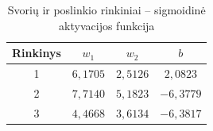 \begin{table}[H]
    \centering
    \caption{Svorių ir poslinkio rinkiniai – sigmoidinė aktyvacijos funkcija}
    \label{tab:sigmoid_weights}
    \begin{tabular}{|c|c|c|c|}
        \hline
        \textbf{Rinkinys} & $w_1$ & $w_2$ & $b$ \\
        \hline
        1 & $6{,}1705$ & $2{,}5126$ & $2{,}0823$ \\
        \hline
        2 & $7{,}7140$ & $5{,}1823$ & $-6{,}3779$ \\
        \hline
        3 & $4{,}4668$ & $3{,}6134$ & $-6{,}3817$ \\
        \hline
    \end{tabular}
\end{table}